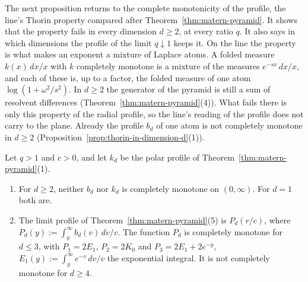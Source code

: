 The next proposition returns to the complete monotonicity of the profile, the line's Thorin
property compared after Theorem~\ref{thm:matern-pyramid}. It shows that the property fails in every
dimension $d \ge 2$, at every ratio $q$. It also says in which dimensions
the profile of the limit $q \downarrow 1$ keeps it. On the line the property is what makes an
exponent a mixture of Laplace atoms. A folded \Levy{} measure $k(x)\,dx/x$ with $k$ completely
monotone is a mixture of the measures $e^{-sx}\,dx/x$, and each of these is, up to a factor, the
folded \Levy{} measure of one atom $\log(1 + \omega^2/s^2)$. In $d \ge 2$ the generator of the
\Matern{} pyramid is still a sum of resolvent differences (Theorem~\ref{thm:matern-pyramid}(4)). What
fails there is only this property of the radial profile, so the line's reading of the profile does
not carry to the plane. Already the profile $b_d$ of one atom is not completely monotone in
$d \ge 2$ (Proposition~\ref{prop:thorin-in-dimension-d}(1)).

\begin{proposition}
\label{prop:thorin-in-dimension-d}

Let $q > 1$ and $c > 0$, and let $k_d$ be the polar profile of Theorem~\ref{thm:matern-pyramid}(1).
\begin{enumerate}
\item For $d \ge 2$, neither $b_d$ nor $k_d$ is completely monotone on $(0, \infty)$. For $d = 1$
both are.
\item The limit profile of Theorem~\ref{thm:matern-pyramid}(5) is $P_d(r/c)$, where
$P_d(y) := \int_y^\infty b_d(v)\,dv/v$. The function $P_d$ is completely monotone for $d \le 3$, with
$P_1 = 2E_1$, $P_2 = 2K_0$ and $P_3 = 2E_1 + 2e^{-y}$, $E_1(y) := \int_y^\infty e^{-v}\,dv/v$ the
exponential integral. It is not completely monotone for $d \ge 4$.
\end{enumerate}
\end{proposition}

